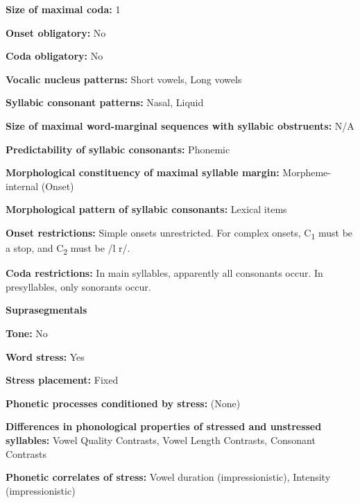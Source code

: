 \textbf{Size of maximal coda:} 1



\textbf{Onset obligatory:} No



\textbf{Coda obligatory:} No



\textbf{Vocalic nucleus patterns:} Short vowels, Long vowels



\textbf{Syllabic consonant patterns:} Nasal, Liquid



\textbf{Size of maximal word{}-marginal sequences with syllabic obstruents:} N/A



\textbf{Predictability of syllabic consonants:} Phonemic



\textbf{Morphological constituency of maximal syllable margin:} Morpheme-internal (Onset)



\textbf{Morphological pattern of syllabic consonants:} Lexical items



\textbf{Onset restrictions:} Simple onsets unrestricted. For complex onsets, C\textsubscript{1} must be a stop, and C\textsubscript{2} must be /l r/. 



\textbf{Coda restrictions:} In main syllables, apparently all consonants occur. In presyllables, only sonorants occur.



\textbf{Suprasegmentals}



\textbf{Tone:} No



\textbf{Word stress:} Yes



\textbf{Stress placement:} Fixed



\textbf{Phonetic processes conditioned by stress:} (None)



\textbf{Differences in phonological properties of stressed and unstressed syllables:} Vowel Quality Contrasts, Vowel Length Contrasts, Consonant Contrasts



\textbf{Phonetic correlates of stress:} Vowel duration (impressionistic), Intensity (impressionistic)



